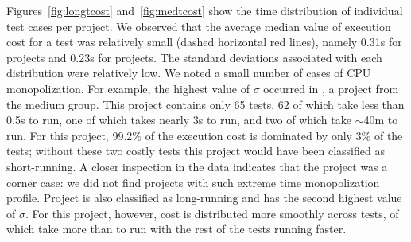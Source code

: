 \sloppy Figures~\ref{fig:longtcost} and~\ref{fig:medtcost} show the
time distribution of individual test cases per project.  We observed
that the average median value of execution cost for a test was
relatively small (dashed horizontal red lines), namely 0.31s for
\medg{} projects and 0.23s for \longg{} projects.  The standard
deviations associated with each distribution were relatively
low.  We noted a small number of
cases of CPU monopolization.  For example, the highest value of
$\sigma$ occurred in , a project from the
medium group.  This project contains only 65 tests, 62 of which take
less than 0.5s to run, one of which takes nearly 3s to run, and two of
which take $\sim$40m to run.  For this project, 99.2\% of the
execution cost is dominated by only 3\% of the tests; without these
two costly tests this project would have been classified as
short-running.  A closer inspection in the data indicates that the
project  was a corner case: we did not find
projects with such extreme time monopolization profile.  Project
 is also classified as long-running
and has the second highest value of $\sigma$.  For this project,
however, cost is distributed more smoothly across  tests, of
which  take more than  to run with the rest of
the tests running faster.

